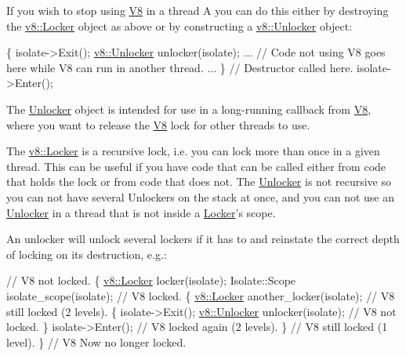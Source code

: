 If you wish to stop using \hyperlink{classv8_1_1V8}{V8} in a thread A you can do this either by destroying the \hyperlink{classv8_1_1Locker}{v8\-::\-Locker} object as above or by constructing a \hyperlink{classv8_1_1Unlocker}{v8\-::\-Unlocker} object\-:


\begin{DoxyCode}
\{
  isolate->Exit();
  \hyperlink{classv8_1_1Unlocker}{v8::Unlocker} unlocker(isolate);
  ...
  \textcolor{comment}{// Code not using V8 goes here while V8 can run in another thread.}
  ...
\} \textcolor{comment}{// Destructor called here.}
isolate->Enter();
\end{DoxyCode}


The \hyperlink{classv8_1_1Unlocker}{Unlocker} object is intended for use in a long-\/running callback from \hyperlink{classv8_1_1V8}{V8}, where you want to release the \hyperlink{classv8_1_1V8}{V8} lock for other threads to use.

The \hyperlink{classv8_1_1Locker}{v8\-::\-Locker} is a recursive lock, i.\-e. you can lock more than once in a given thread. This can be useful if you have code that can be called either from code that holds the lock or from code that does not. The \hyperlink{classv8_1_1Unlocker}{Unlocker} is not recursive so you can not have several Unlockers on the stack at once, and you can not use an \hyperlink{classv8_1_1Unlocker}{Unlocker} in a thread that is not inside a \hyperlink{classv8_1_1Locker}{Locker}'s scope.

An unlocker will unlock several lockers if it has to and reinstate the correct depth of locking on its destruction, e.\-g.\-:


\begin{DoxyCode}
\textcolor{comment}{// V8 not locked.}
\{
  \hyperlink{classv8_1_1Locker}{v8::Locker} locker(isolate);
  Isolate::Scope isolate\_scope(isolate);
  \textcolor{comment}{// V8 locked.}
  \{
    \hyperlink{classv8_1_1Locker}{v8::Locker} another\_locker(isolate);
    \textcolor{comment}{// V8 still locked (2 levels).}
    \{
      isolate->Exit();
      \hyperlink{classv8_1_1Unlocker}{v8::Unlocker} unlocker(isolate);
      \textcolor{comment}{// V8 not locked.}
    \}
    isolate->Enter();
    \textcolor{comment}{// V8 locked again (2 levels).}
  \}
  \textcolor{comment}{// V8 still locked (1 level).}
\}
\textcolor{comment}{// V8 Now no longer locked.}
\end{DoxyCode}
 

